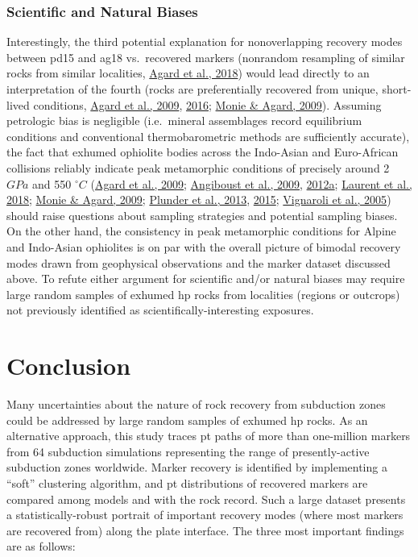 \hypertarget{scientific-and-natural-biases}{%
\subsubsection{Scientific and Natural Biases}\label{scientific-and-natural-biases}}

Interestingly, the third potential explanation for nonoverlapping recovery modes between pd15 and ag18 vs.~recovered markers (nonrandom resampling of similar rocks from similar localities, \protect\hyperlink{ref-agard2018}{Agard et al., 2018}) would lead directly to an interpretation of the fourth (rocks are preferentially recovered from unique, short-lived conditions, \protect\hyperlink{ref-agard2009}{Agard et al., 2009}, \protect\hyperlink{ref-agard2016}{2016}; \protect\hyperlink{ref-monie2009}{Monie \& Agard, 2009}). Assuming petrologic bias is negligible (i.e.~mineral assemblages record equilibrium conditions and conventional thermobarometric methods are sufficiently accurate), the fact that exhumed ophiolite bodies across the Indo-Asian and Euro-African collisions reliably indicate peak metamorphic conditions of precisely around 2 \(GPa\) and 550 \(^\circ C\) (\protect\hyperlink{ref-agard2009}{Agard et al., 2009}; \protect\hyperlink{ref-angiboust2009}{Angiboust et al., 2009}, \protect\hyperlink{ref-angiboust2012a}{2012a}; \protect\hyperlink{ref-laurent2018}{Laurent et al., 2018}; \protect\hyperlink{ref-monie2009}{Monie \& Agard, 2009}; \protect\hyperlink{ref-plunder2013}{Plunder et al., 2013}, \protect\hyperlink{ref-plunder2015}{2015}; \protect\hyperlink{ref-vignaroli2005}{Vignaroli et al., 2005}) should raise questions about sampling strategies and potential sampling biases. On the other hand, the consistency in peak metamorphic conditions for Alpine and Indo-Asian ophiolites is on par with the overall picture of bimodal recovery modes drawn from geophysical observations and the marker dataset discussed above. To refute either argument for scientific and/or natural biases may require large random samples of exhumed \gls{hp} rocks from localities (regions or outcrops) not previously identified as scientifically-interesting exposures.

\hypertarget{chpt4Conclusions}{%
\section{Conclusion}\label{chpt4Conclusions}}

Many uncertainties about the nature of rock recovery from subduction zones could be addressed by large random samples of exhumed \gls{hp} rocks. As an alternative approach, this study traces \gls{pt} paths of more than one-million markers from 64 subduction simulations representing the range of presently-active subduction zones worldwide. Marker recovery is identified by implementing a ``soft'' clustering algorithm, and \gls{pt} distributions of recovered markers are compared among models and with the rock record. Such a large dataset presents a statistically-robust portrait of important recovery modes (where most markers are recovered from) along the plate interface. The three most important findings are as follows:

